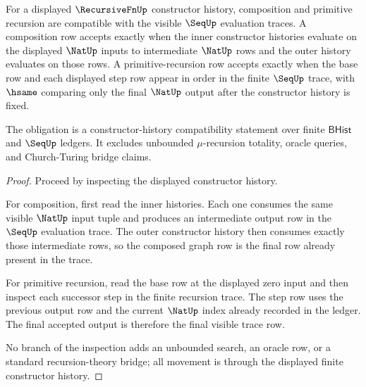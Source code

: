 \begin{theorem}
\label{thm:recursivefn-composition-primitive-recursion-obligation}
For a displayed $\RecursiveFnUp$ constructor history, composition and primitive
recursion are compatible with the visible $\SeqUp$ evaluation traces. A
composition row accepts exactly when the inner constructor histories evaluate
on the displayed $\NatUp$ inputs to intermediate $\NatUp$ rows and the outer
history evaluates on those rows. A primitive-recursion row accepts exactly when
the base row and each displayed step row appear in order in the finite
$\SeqUp$ trace, with $\hsame$ comparing only the final $\NatUp$ output after
the constructor history is fixed.

The obligation is a constructor-history compatibility statement over finite
$\mathsf{BHist}$ and $\SeqUp$ ledgers. It excludes unbounded
$\mu$-recursion totality, oracle queries, and Church-Turing bridge claims.
\end{theorem}
\begin{proof}
Proceed by inspecting the displayed constructor history.

For composition, first read the inner histories. Each one consumes the same
visible $\NatUp$ input tuple and produces an intermediate output row in the
$\SeqUp$ evaluation trace. The outer constructor history then consumes exactly
those intermediate rows, so the composed graph row is the final row already
present in the trace.

For primitive recursion, read the base row at the displayed zero input and
then inspect each successor step in the finite recursion trace. The step row
uses the previous output row and the current $\NatUp$ index already recorded in
the ledger. The final accepted output is therefore the final visible trace row.

No branch of the inspection adds an unbounded search, an oracle row, or a
standard recursion-theory bridge; all movement is through the displayed finite
constructor history.
\end{proof}

